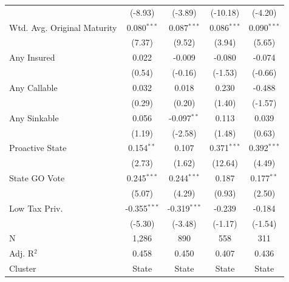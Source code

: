\begin{tabular*}{\textwidth}{@{\extracolsep{\fill}}lcccc}
                               & (-8.93)               & (-3.89)                      & (-10.18)                     & (-4.20)\\   
   Wtd. Avg. Original Maturity & 0.080$^{***}$          & 0.087$^{***}$                 & 0.086$^{***}$                 & 0.090$^{***}$\\   
                               & (7.37)                & (9.52)                       & (3.94)                       & (5.65)\\   
   Any Insured                 & 0.022                  & -0.009                        & -0.080                        & -0.074\\   
                               & (0.54)                & (-0.16)                      & (-1.53)                      & (-0.66)\\   
   Any Callable                & 0.032                  & 0.018                         & 0.230                         & -0.488\\   
                               & (0.29)                & (0.20)                       & (1.40)                       & (-1.57)\\   
   Any Sinkable                & 0.056                  & -0.097$^{**}$                 & 0.113                         & 0.039\\   
                               & (1.19)                & (-2.58)                      & (1.48)                       & (0.63)\\   
   Proactive State             & 0.154$^{**}$           & 0.107                         & 0.371$^{***}$                 & 0.392$^{***}$\\   
                               & (2.73)                & (1.62)                       & (12.64)                      & (4.49)\\   
   State GO Vote               & 0.245$^{***}$          & 0.244$^{***}$                 & 0.187                         & 0.177$^{**}$\\   
                               & (5.07)                & (4.29)                       & (0.93)                       & (2.50)\\   
   Low Tax Priv.               & -0.355$^{***}$         & -0.319$^{***}$                & -0.239                        & -0.184\\   
                               & (-5.30)               & (-3.48)                      & (-1.17)                      & (-1.54)\\   
   \hline
   N                & 1,286                  & 890                           & 558                           & 311\\  
   Adj. R$^2$              & 0.458                  & 0.450                         & 0.407                         & 0.436\\  
   Cluster              & State & State & State & State\\  
   \bottomrule
\end{tabular*}
\par\endgroup
